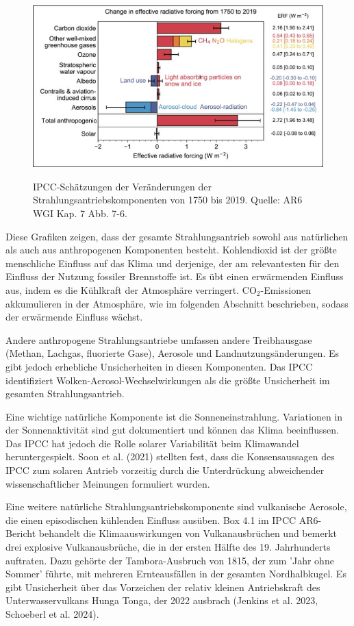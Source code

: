 \documentclass[12pt,paper=a4,DIV=12,parskip=never,chapterprefix=false,headings=standardclasses]{scrreprt}
\begin{document}
\begin{figure}[H]
\begin{center}
\includegraphics[width=1.0\textwidth]{bilder/bilderKlima-0007.jpg}\\[1cm]
\end{center}
\caption{IPCC-Schätzungen der Veränderungen der Strahlungsantriebskomponenten von 1750 bis 2019. Quelle:
AR6 WGI Kap. 7 Abb. 7-6.}
\end{figure}

Diese Grafiken zeigen, dass der gesamte Strahlungsantrieb sowohl aus natürlichen als auch aus anthropogenen Komponenten besteht. Kohlendioxid ist der größte menschliche Einfluss auf das Klima und derjenige, der am relevantesten für den Einfluss der Nutzung fossiler Brennstoffe ist. Es übt einen erwärmenden Einfluss aus, indem es die Kühlkraft der Atmosphäre verringert. CO$_2$-Emissionen akkumulieren in der Atmosphäre, wie im folgenden Abschnitt beschrieben, sodass der erwärmende Einfluss wächst.

Andere anthropogene Strahlungsantriebe umfassen andere Treibhausgase (Methan, Lachgas, fluorierte Gase), Aerosole und Landnutzungsänderungen. Es gibt jedoch erhebliche Unsicherheiten in diesen Komponenten. Das IPCC identifiziert Wolken-Aerosol-Wechselwirkungen als die größte Unsicherheit im gesamten Strahlungsantrieb.

Eine wichtige natürliche Komponente ist die Sonneneinstrahlung. Variationen in der Sonnenaktivität sind gut dokumentiert und können das Klima beeinflussen. Das IPCC hat jedoch die Rolle solarer Variabilität beim Klimawandel heruntergespielt. Soon et al. (2021) stellten fest, dass die Konsensaussagen des IPCC zum solaren Antrieb vorzeitig durch die Unterdrückung abweichender wissenschaftlicher Meinungen formuliert wurden.

Eine weitere natürliche Strahlungsantriebskomponente sind vulkanische Aerosole, die einen episodischen kühlenden Einfluss ausüben. Box 4.1 im IPCC AR6-Bericht behandelt die Klimaauswirkungen von Vulkanausbrüchen und bemerkt drei explosive Vulkanausbrüche, die in der ersten Hälfte des 19. Jahrhunderts auftraten. Dazu gehörte der Tambora-Ausbruch von 1815, der zum 'Jahr ohne Sommer' führte, mit mehreren Ernteausfällen in der gesamten Nordhalbkugel. Es gibt Unsicherheit über das Vorzeichen der relativ kleinen Antriebskraft des Unterwasservulkans Hunga Tonga, der 2022 ausbrach (Jenkins et al. 2023, Schoeberl et al. 2024).
\end{document}
